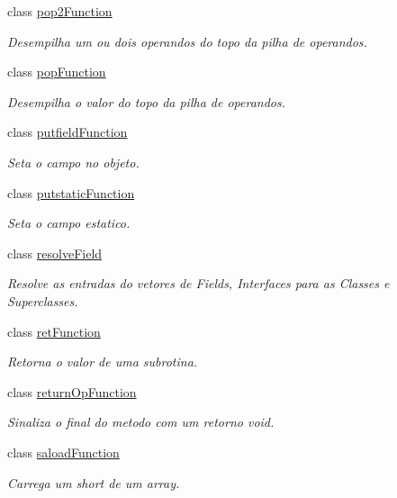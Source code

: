 \begin{DoxyCompactItemize}
class \hyperlink{classInstruction_1_1pop2Function}{pop2\+Function}
\begin{DoxyCompactList}\small\item\em Desempilha um ou dois operandos do topo da pilha de operandos. \end{DoxyCompactList}\item 
class \hyperlink{classInstruction_1_1popFunction}{pop\+Function}
\begin{DoxyCompactList}\small\item\em Desempilha o valor do topo da pilha de operandos. \end{DoxyCompactList}\item 
class \hyperlink{classInstruction_1_1putfieldFunction}{putfield\+Function}
\begin{DoxyCompactList}\small\item\em Seta o campo no objeto. \end{DoxyCompactList}\item 
class \hyperlink{classInstruction_1_1putstaticFunction}{putstatic\+Function}
\begin{DoxyCompactList}\small\item\em Seta o campo estatico. \end{DoxyCompactList}\item 
class \hyperlink{classInstruction_1_1resolveField}{resolve\+Field}
\begin{DoxyCompactList}\small\item\em Resolve as entradas do vetores de Fields, Interfaces para as Classes e Superclasses. \end{DoxyCompactList}\item 
class \hyperlink{classInstruction_1_1retFunction}{ret\+Function}
\begin{DoxyCompactList}\small\item\em Retorna o valor de uma subrotina. \end{DoxyCompactList}\item 
class \hyperlink{classInstruction_1_1returnOpFunction}{return\+Op\+Function}
\begin{DoxyCompactList}\small\item\em Sinaliza o final do metodo com um retorno void. \end{DoxyCompactList}\item 
class \hyperlink{classInstruction_1_1saloadFunction}{saload\+Function}
\begin{DoxyCompactList}\small\item\em Carrega um short de um array. \end{DoxyCompactList}\item 

\end{DoxyCompactItemize}
